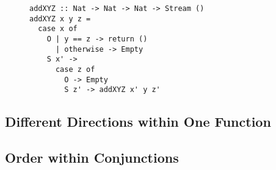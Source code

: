 \begin{figure}[!t]
  \centering
  \begin{minipage}{\columnwidth}
    \begin{lstlisting}[label={add_x_y_z}, caption={Function for \lstinline{addo in in in} direction}, captionpos=b, frame=tb]
addXYZ :: Nat -> Nat -> Nat -> Stream ()
addXYZ x y z =
  case x of
    O | y == z -> return ()
      | otherwise -> Empty
    S x' ->
      case z of
        O -> Empty
        S z' -> addXYZ x' y z'
    \end{lstlisting}
  \end{minipage}
\end{figure}

\subsection{Different Directions within One Function}


\subsection{Order within Conjunctions}

